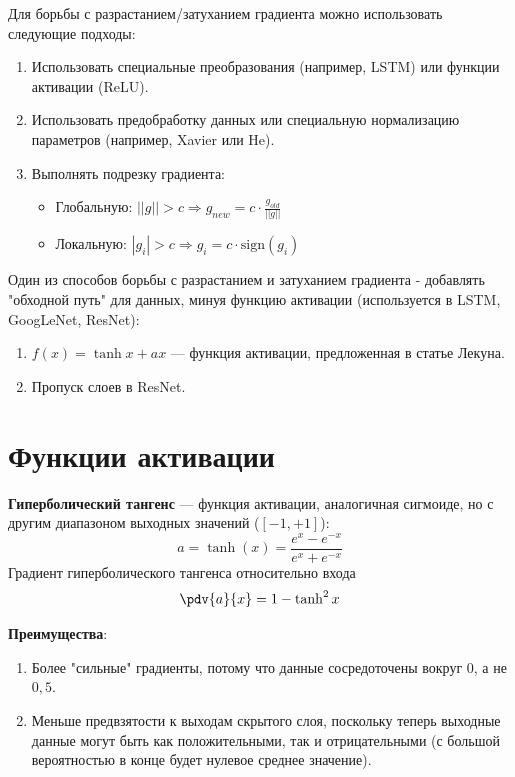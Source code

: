 \begin{remark}
    Для борьбы с разрастанием/затуханием градиента можно использовать следующие подходы:
    \begin{enumerate}
        \item Использовать специальные преобразования (например, LSTM) или функции активации (ReLU).
        \item Использовать предобработку данных или специальную нормализацию параметров (например, Xavier или He).
        \item Выполнять подрезку градиента:
        \begin{itemize}
            \item Глобальную: $||g||>c\Rightarrow g_{new}=c\cdot\frac{g_{old}}{||g||}$
            \item Локальную: $|g_i|>c\Rightarrow g_i=c\cdot\mathrm{sign}(g_i)$
        \end{itemize}
    \end{enumerate}
\end{remark}

\begin{remark}
    Один из способов борьбы с разрастанием и затуханием градиента - добавлять "обходной путь" для данных, минуя функцию активации (используется в LSTM, GoogLeNet, ResNet):
    \begin{enumerate}
        \item $f(x)=\tanh{x}+ax$ --- функция активации, предложенная в статье Лекуна.
        \item Пропуск слоев в ResNet.
    \end{enumerate}
\end{remark}

\section{Функции активации}

\begin{definition}
    \textbf{Гиперболический тангенс} --- функция активации, аналогичная сигмоиде, но с другим диапазоном выходных значений ($[-1, +1]$):
    \[
        a=\tanh(x)=\dfrac{e^x-e^{-x}}{e^x+e^{-x}}
    \]
    Градиент гиперболического тангенса относительно входа
    \[
        \pdv{a}{x}=1-\tanh^2x
    \]
\end{definition}

\textbf{Преимущества}:
\begin{enumerate}
    \item Более "сильные" градиенты, потому что данные сосредоточены вокруг $0$, а не $0,5$.
    \item Меньше предвзятости к выходам скрытого слоя, поскольку теперь выходные данные могут быть как положительными, так и отрицательными (с большой вероятностью в конце будет нулевое среднее значение).
\end{enumerate}

